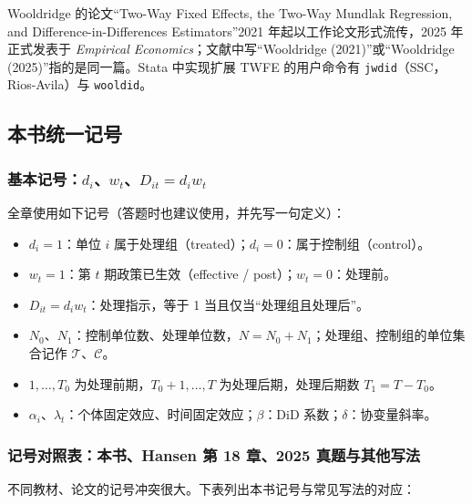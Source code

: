 \begin{note}[文献与软件]
Wooldridge 的论文“Two-Way Fixed Effects, the Two-Way Mundlak Regression, and Difference-in-Differences Estimators”2021 年起以工作论文形式流传，2025 年正式发表于 \textit{Empirical Economics}；文献中写“Wooldridge (2021)”或“Wooldridge (2025)”指的是同一篇。Stata 中实现扩展 TWFE 的用户命令有 \texttt{jwdid}（SSC，Rios-Avila）与 \texttt{wooldid}。
\end{note}

\subsection{本书统一记号}

\subsubsection{基本记号：\texorpdfstring{$d_i$、$w_t$、$D_{it}=d_iw_t$}{d\_i, w\_t, D\_it = d\_i w\_t}}

全章使用如下记号（答题时也建议使用，并先写一句定义）：
\begin{itemize}
  \item $d_i=1$：单位 $i$ 属于处理组（treated）；$d_i=0$：属于控制组（control）。
  \item $w_t=1$：第 $t$ 期政策已生效（effective / post）；$w_t=0$：处理前。
  \item $D_{it}=d_iw_t$：处理指示，等于 1 当且仅当“处理组且处理后”。
  \item $N_0$、$N_1$：控制单位数、处理单位数，$N=N_0+N_1$；处理组、控制组的单位集合记作 $\mathcal T$、$\mathcal C$。
  \item $1,\dots,T_0$ 为处理前期，$T_0+1,\dots,T$ 为处理后期，处理后期数 $T_1=T-T_0$。
  \item $\alpha_i$、$\lambda_t$：个体固定效应、时间固定效应；$\beta$：DiD 系数；$\delta$：协变量斜率。
\end{itemize}

\subsubsection{记号对照表：本书、Hansen 第 18 章、2025 真题与其他写法}

不同教材、论文的记号冲突很大。下表列出本书记号与常见写法的对应：

